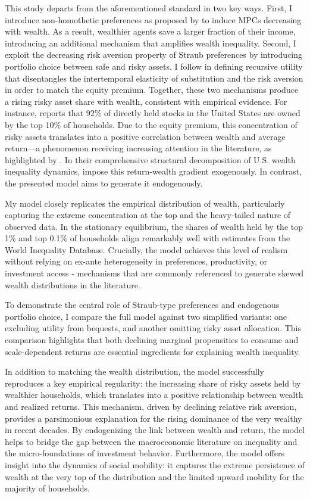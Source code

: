 \documentclass[12pt]{article}
\begin{document}
This study departs  from the aforementioned standard in two key ways. First, I introduce non-homothetic preferences as proposed by \textcite{straub2019} to induce MPCs decreasing with wealth. As a result, wealthier agents save a larger fraction of their income, introducing an additional mechanism that amplifies wealth inequality. Second, I exploit the decreasing risk aversion property of Straub preferences by introducing portfolio choice between safe and risky assets. I follow \textcite{epstein1989} in defining recursive utility that disentangles the intertemporal elasticity of substitution and the risk aversion in order to match the equity premium. Together, these two mechanisms produce a rising risky asset share with wealth, consistent with empirical evidence. For instance, \textcite{scf2022} reports that 92\% of directly held stocks in the United States are owned by the top 10\% of households. Due to the equity premium, this concentration of risky assets translates into a positive correlation between wealth and average return—a phenomenon receiving increasing attention in the literature, as highlighted by \textcite{fagereng2020}. In their comprehensive structural decomposition of U.S. wealth inequality dynamics, \textcite{hubmer2021} impose this return-wealth gradient exogenously. In contrast, the presented model aims to generate it endogenously.

My model closely replicates the empirical distribution of wealth, particularly capturing the extreme concentration at the top and the heavy-tailed nature of observed data. In the stationary equilibrium, the shares of wealth held by the top 1\% and top 0.1\% of households align remarkably well with estimates from the World Inequality Database. Crucially, the model achieves this level of realism without relying on ex-ante heterogeneity in preferences, productivity, or investment access - mechanisms that are commonly referenced to generate skewed wealth distributions in the literature.

To demonstrate the central role of Straub-type preferences and endogenous portfolio choice, I compare the full model against two simplified variants: one excluding utility from bequests, and another omitting risky asset allocation. This comparison highlights that both declining marginal propensities to consume and scale-dependent returns are essential ingredients for explaining wealth inequality.

In addition to matching the wealth distribution, the model successfully reproduces a key empirical regularity: the increasing share of risky assets held by wealthier households, which translates into a positive relationship between wealth and realized returns. This mechanism, driven by declining relative risk aversion, provides a parsimonious explanation for the rising dominance of the very wealthy in recent decades. By endogenizing the link between wealth and return, the model helps to bridge the gap between the macroeconomic literature on inequality and the micro-foundations of investment behavior. Furthermore, the model offers insight into the dynamics of social mobility: it captures the extreme persistence of wealth at the very top of the distribution and the limited upward mobility for the majority of households. 
\end{document}
